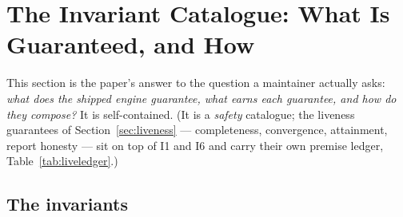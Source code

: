 \documentclass[11pt]{article}
\theoremstyle{plain}
\theoremstyle{definition}
\theoremstyle{remark}
\begin{document}
\section{The Invariant Catalogue: What Is Guaranteed, and How}
\label{sec:invariants}

This section is the paper's answer to the question a maintainer
actually asks: \emph{what does the shipped engine guarantee, what earns
each guarantee, and how do they compose?}  It is self-contained.  (It
is a \emph{safety} catalogue; the liveness guarantees of
Section~\ref{sec:liveness} --- completeness, convergence, attainment,
report honesty --- sit on top of I1 and I6 and carry their own premise
ledger, Table~\ref{tab:liveledger}.)

\subsection{The invariants}
\end{document}

